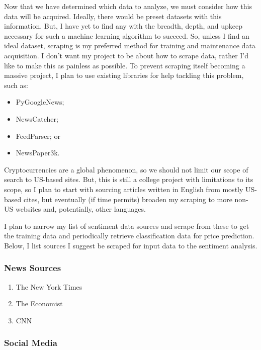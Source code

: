 \documentclass[10pt,twocolumn]{article}
\begin{document}
Now that we have determined which data to analyze, we must consider how this data will be acquired. Ideally, there would be preset datasets with this information. But, I have yet to find any with the breadth, depth, and upkeep necessary for such a machine learning algorithm to succeed. So, unless I find an ideal dataset, scraping is my preferred method for training and maintenance data acquisition. I don’t want my project to be about how to scrape data, rather I’d like to make this as painless as possible. To prevent scraping itself becoming a massive project, I plan to use existing libraries for help tackling this problem, such as:

\begin{itemize}
    \item PyGoogleNews;
    \item NewsCatcher;
    \item FeedParser; or
    \item NewsPaper3k.
\end{itemize}

Cryptocurrencies are a global phenomenon, so we should not limit our scope of search to US-based sites. But, this is still a college project with limitations to its scope, so I plan to start with sourcing articles written in English from mostly US-based cites, but eventually (if time permits) broaden my scraping to more non-US websites and, potentially, other languages.

I plan to narrow my list of sentiment data sources and scrape from these to get the training data and periodically retrieve classification data for price prediction. Below, I list sources I suggest be scraped for input data to the sentiment analysis.

\subsubsection{News Sources}
\label{sec:newssources}

\begin{enumerate}
    \item The New York Times
    \item The Economist
    \item CNN
\end{enumerate}

\subsubsection{Social Media}
\end{document}
